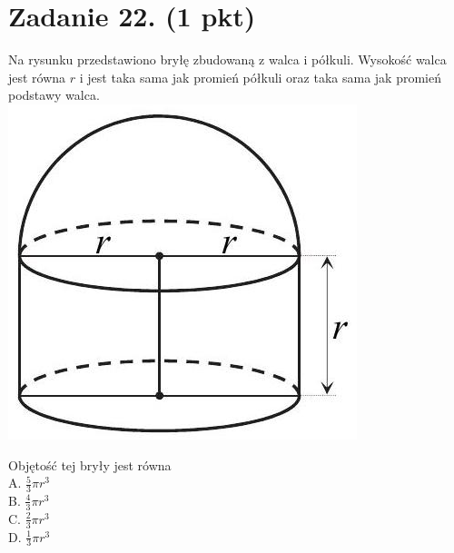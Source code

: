 \documentclass[10pt]{article}
\begin{document}
\section*{Zadanie 22. (1 pkt)}
Na rysunku przedstawiono bryłę zbudowaną z walca i półkuli. Wysokość walca jest równa \(r\) i jest taka sama jak promień półkuli oraz taka sama jak promień podstawy walca.\\
\includegraphics[max width=\textwidth, center]{2024_11_21_9383c97fb44abf35abe9g-10}

Objętość tej bryły jest równa\\
A. \(\frac{5}{3} \pi r^{3}\)\\
B. \(\frac{4}{3} \pi r^{3}\)\\
C. \(\frac{2}{3} \pi r^{3}\)\\
D. \(\frac{1}{3} \pi r^{3}\)
\end{document}
